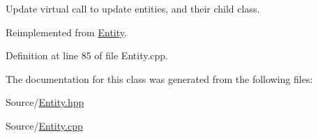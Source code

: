 Update virtual call to update entities, and their child class. 



Reimplemented from \hyperlink{class_entity_a7e2a7c5df3bceaf41deea192eeba4d8f}{Entity}.



Definition at line 85 of file Entity.\-cpp.



The documentation for this class was generated from the following files\-:\begin{DoxyCompactItemize}
\item 
Source/\hyperlink{_entity_8hpp}{Entity.\-hpp}\item 
Source/\hyperlink{_entity_8cpp}{Entity.\-cpp}\end{DoxyCompactItemize}
